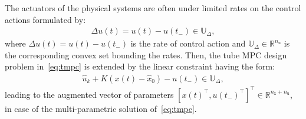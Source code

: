 \documentclass[letterpaper, 10 pt, conference]{ieeeconf}
\begin{document}
	
	The actuators of the physical systems are often under limited rates on the control actions formulated by:
	\begin{eqnarray}
		\label{eq:rate_constraints_x_u}
		\Delta u(t) = u(t) - u(t_{-}) \in \mathbb{U}_{\Delta} ,
	\end{eqnarray}
	where $\Delta u(t) = u(t) - u(t_{-})$ is the rate of control action and $\mathbb{U}_{\Delta} \in \mathbb{R}^{n_{\mathrm{u}}}$ is the corresponding convex set bounding the rates. Then, the tube MPC design problem in~\eqref{eq:tmpc} is extended by the linear constraint having the form: 
	\begin{eqnarray}
		\label{eq:tmpc_constraints_input_delta_0}
		\hat{u}_{k} + K ( x(t) - \hat{x}_{0} ) - u(t_{-}) \in \mathbb{U}_{\Delta} , 
	\end{eqnarray}
	leading to the augmented vector of parameters $[x(t)^{\top}, u(t_{-})^{\top}]^{\top} \in \mathbb{R}^{n_{\mathrm{x}} + n_{\mathrm{u}}}$, in case of the multi-parametric solution of~\eqref{eq:tmpc}.
	
	
\end{document}
